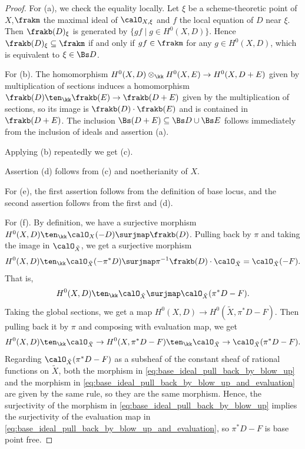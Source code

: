   \begin{proof}
    For (a), we check the equality locally.
    Let $\xi$ be a scheme-theoretic point of $X$,$\frakm$ the maximal ideal of $\calO_{X,\xi}$ and $f$ the local equation of $D$ near $\xi$.
    Then $\frakb(D)_\xi$ is generated by $\{gf \mid g \in H^0(X, D)\}$.
    Hence $\frakb(D)_\xi \subseteq \frakm$ if and only if $gf \in \frakm$ for any $g \in H^0(X, D)$, which is equivalent to $\xi \in \Bs D$.

    For (b). 
    The homomorphism $H^0(X, D) \otimes_\kk H^0(X, E) \to H^0(X, D+E)$ given by multiplication of sections induces a homomorphism $\frakb(D) \ten_\kk \frakb(E) \to \frakb(D+E)$ given by the multiplication of sections, so its image is $\frakb(D) \cdot \frakb(E)$ and is contained in $\frakb(D+E)$.
    The inclusion $\Bs(D+E) \subseteq \Bs D \cup \Bs E$ follows immediately from the inclusion of ideals and assertion (a).

    Applying (b) repeatedly we get (c).

    Assertion (d) follows from (c) and noetherianity of $X$.

    For (e), the first assertion follows from the definition of base locus, and the second assertion follows from the first and (d).
    
    For (f).
    By definition, we have a surjective morphism $H^0(X, D) \ten_\kk \calO_X(-D) \surjmap \frakb(D)$.
    Pulling back by $\pi$ and taking the image in $\calO_{\tilde{X}}$, we get a surjective morphism
    \[ H^0(X, D) \ten_\kk \calO_{\tilde{X}}(-\pi^* D) \surjmap \pi^{-1} \frakb(D) \cdot \calO_{\tilde{X}} = \calO_{\tilde{X}}(-F). \]
    That is, 
    \begin{equation}\label{eq:base_ideal_pull_back_by_blow_up}
      H^0(X, D) \ten_\kk \calO_{\tilde{X}} \surjmap \calO_{\tilde{X}}(\pi^* D-F).
    \end{equation}
    Taking the global sections, we get a map $H^0(X, D) \to H^0(\tilde{X}, \pi^* D-F)$.
    Then pulling back it by $\pi$ and composing with evaluation map, we get
    \begin{equation}\label{eq:base_ideal_pull_back_by_blow_up_and_evaluation}
      H^0(X, D) \ten_\kk \calO_{\tilde{X}} \to H^0(X, \pi^* D-F) \ten_\kk \calO_{\tilde{X}} \to \calO_{\tilde{X}}(\pi^* D-F).
    \end{equation}
    Regarding $\calO_{\tilde{X}}(\pi^* D-F)$ as a subsheaf of the constant sheaf of rational functions on $\tilde{X}$, both the morphism in \cref{eq:base_ideal_pull_back_by_blow_up} and the morphism in \cref{eq:base_ideal_pull_back_by_blow_up_and_evaluation} are given by the same rule, so they are the same morphism.
    Hence, the surjectivity of the morphism in \cref{eq:base_ideal_pull_back_by_blow_up} implies the surjectivity of the evaluation map in \cref{eq:base_ideal_pull_back_by_blow_up_and_evaluation}, so $\pi^* D - F$ is base point free.
  \end{proof}

